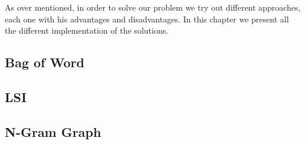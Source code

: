 As over mentioned, in order to solve our problem we try out different approaches, each one with his advantages and disadvantages. In this chapter we present all the different implementation of the solutions.
\subsection*{Bag of Word}
\subsection*{LSI}
\subsection*{N-Gram Graph}
